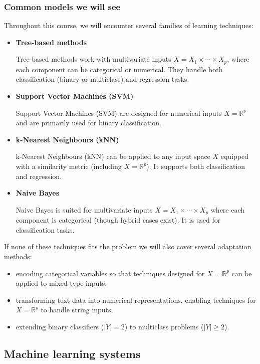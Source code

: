 \subsubsection{Common models we will see}

Throughout this course, we will encounter several families of learning techniques:

\begin{itemize}
  \item \textbf{Tree-based methods} 
  
  Tree-based methods work with multivariate inputs $X = X_1 \times \cdots \times X_p$, where each component can be categorical or numerical. They handle both classification (binary or multiclass) and regression tasks.
  \item \textbf{Support Vector Machines (SVM)}
  
  Support Vector Machines (SVM) are designed for numerical inputs $X = \mathbb{R}^p$ and are primarily used for binary classification.
  \item \textbf{k-Nearest Neighbours (kNN)} 
  
  k-Nearest Neighbours (kNN) can be applied to any input space $X$ equipped with a similarity metric (including $X = \mathbb{R}^p$). It supports both classification and regression.
  \item \textbf{Naive Bayes} 
  
  Naive Bayes is suited for multivariate inputs $X = X_1 \times \cdots \times X_p$ where each component is categorical (though hybrid cases exist). It is used for classification tasks.
\end{itemize}

\medskip

If none of these techniques fits the problem we will also cover several adaptation methods:
\begin{itemize}
  \item encoding categorical variables so that techniques designed for $X = \mathbb{R}^p$ can be applied to mixed-type inputs;
  \item transforming text data into numerical representations, enabling techniques for $X = \mathbb{R}^p$ to handle string inputs;
  \item extending binary classifiers ($|Y| = 2$) to multiclass problems ($|Y| \geq 2$).
\end{itemize}

\subsection{Machine learning systems}

